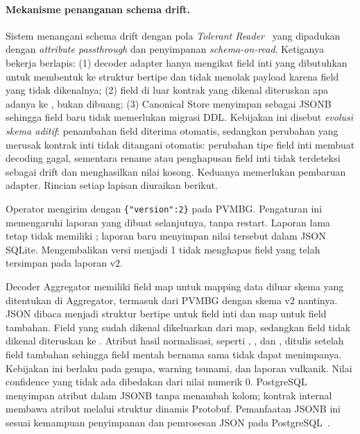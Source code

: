 \paragraph{Mekanisme penanganan schema drift.} Sistem menangani schema drift dengan pola \emph{Tolerant Reader}~\cite{tolerantreader} yang dipadukan dengan \emph{attribute passthrough} dan penyimpanan \emph{schema-on-read}. Ketiganya bekerja berlapis: (1) decoder adapter hanya mengikat field inti yang dibutuhkan untuk membentuk  ke struktur bertipe dan tidak menolak payload karena field yang tidak dikenalnya; (2) field di luar kontrak yang dikenal diteruskan apa adanya ke , bukan dibuang; (3) Canonical Store menyimpan  sebagai JSONB sehingga field baru tidak memerlukan migrasi DDL. Kebijakan ini disebut \emph{evolusi skema aditif}: penambahan field diterima otomatis, sedangkan perubahan yang merusak kontrak inti tidak ditangani otomatis: perubahan tipe field inti membuat decoding gagal, sementara rename atau penghapusan field inti tidak terdeteksi sebagai drift dan menghasilkan nilai kosong. Keduanya memerlukan pembaruan adapter. Rincian setiap lapisan diuraikan berikut.

Operator mengirim  dengan \verb|{"version":2}| pada PVMBG. Pengaturan ini memengaruhi laporan yang dibuat selanjutnya, tanpa restart. Laporan lama tetap tidak memiliki ; laporan baru menyimpan nilai tersebut dalam JSON SQLite. Mengembalikan versi menjadi 1 tidak menghapus field yang telah tersimpan pada laporan v2.

Decoder Aggregator memiliki field map  untuk mapping data diluar skema yang ditentukan di Aggregator, termasuk  dari PVMBG dengan skema v2 nantinya. JSON dibaca menjadi struktur bertipe untuk field inti dan map untuk field tambahan. Field yang sudah dikenal dikeluarkan dari map, sedangkan field tidak dikenal diteruskan ke . Atribut hasil normalisasi, seperti , , dan , ditulis setelah field tambahan sehingga field mentah bernama sama tidak dapat menimpanya. Kebijakan ini berlaku pada gempa, warning tsunami, dan laporan vulkanik. Nilai confidence yang tidak ada dibedakan dari nilai numerik 0. PostgreSQL menyimpan atribut dalam JSONB tanpa menambah kolom; kontrak internal membawa atribut melalui struktur dinamis Protobuf. Pemanfaatan JSONB ini sesuai kemampuan penyimpanan dan pemrosesan JSON pada PostgreSQL~\cite{postgres}.

